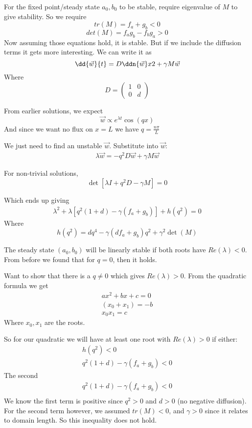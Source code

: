 \documentclass{X:/Documents/Coding/Latex/myassignment}
\begin{document}
For the fixed point/steady state $a_0,b_0$ to be stable, require eigenvalue of $M$ to give stability. So we require
\[tr(M) = f_a + g_b < 0 \]
\[det(M) = f_ag_b - f_bg_a >0\]
Now assuming those equations hold, it is stable. But if we include the diffusion terms it gets more interesting. We can write it as
\[\dd {\vec w}{t} = D \ddn{\vec w} x2 + \gamma M \vec w\]
Where
\[D = \begin{pmatrix}
	1&0\\0&d
\end{pmatrix}\]

From earlier solutions, we expect 
\[\vec w \propto e^{\lambda t} \cos(q x)\]
And since we want no flux on $x=L$ we have $q = \frac{n\pi}{L}$

We just need to find an unstable $\vec w$. Substitute into $\vec w$:
\begin{align*}
	\lambda \vec w = - q^2 D \vec w + \gamma M \vec w
\end{align*}

For non-trivial solutions,
\[\det \left[\lambda I + q^2 D - \gamma M\right] = 0 \]

Which ends up giving 
\begin{align*}
	\lambda^2 + \lambda [q^2(1+d) - \gamma (f_a + g_b)] + h(q^2) = 0
\end{align*}
Where 
\[h(q^2) = dq^4 - \gamma (df_a + g_b)q^2 + \gamma^2 \det(M)\]

The steady state $(a_0,b_0)$ will be linearly stable if both roots have $Re(\lambda) < 0 $. From before we found that for $q=0$, then it holds.

Want to show that there is a $q \neq 0$ which gives $Re(\lambda) > 0$. 
From the quadratic formula we get
\begin{align*}
	ax^2 + bx + c =0\\
	(x_0+x_1) = -b\\
	x_0x_1 = c
\end{align*}
Where $x_0, x_1$ are the roots.

So for our quadratic we will have at least one root with $Re(\lambda) > 0$ if either:
\begin{align*}
	h(q^2) < 0\\
	q^2(1+d) - \gamma (f_a + g_b) < 0 
\end{align*}
The second 
\begin{align*}
	q^2(1+d) - \gamma (f_a + g_b) < 0 \\
\end{align*}
We know the first term is positive since $q^2 > 0$ and $d > 0$ (no negative diffusion).
For the second term however, we assumed $tr(M) <0$, and $\gamma > 0$ since it relates to domain length. So this inequality does not hold.
\end{document}
